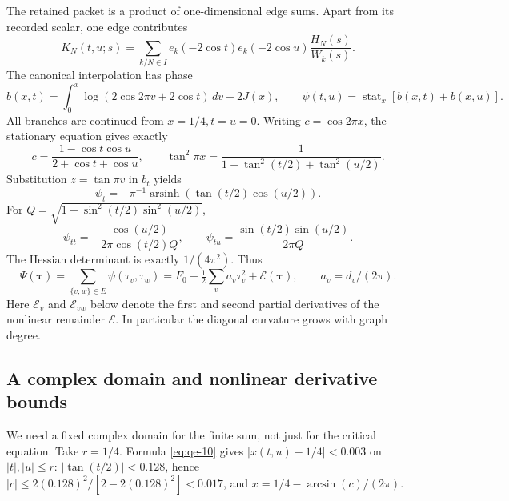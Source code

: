 The retained packet is a product of one-dimensional edge sums. Apart
from its recorded scalar, one edge contributes
\begin{equation}
K_N(t,u;s)=\sum_{k/N\in I}e_k(-2\cos t)e_k(-2\cos u)
                                      \frac{H_N(s)}{W_k(s)}.
\label{eq:qe-8}
\end{equation}
The canonical interpolation has phase
\begin{equation}
b(x,t)=\int_0^x\log(2\cos2\pi v+2\cos t)\,dv-2J(x),\qquad
 \psi(t,u)=\operatorname{stat}_x[b(x,t)+b(x,u)].
\label{eq:qe-9}
\end{equation}
All branches are continued from \(x=1/4,t=u=0\). Writing \(c=\cos2\pi x\), the stationary equation gives exactly
\begin{equation}
c=\frac{1-\cos t\cos u}{2+\cos t+\cos u},\qquad
 \tan^2\pi x=\frac1{1+\tan^2(t/2)+\tan^2(u/2)}.
\label{eq:qe-10}
\end{equation}
Substitution \(z=\tan\pi v\) in \(b_t\) yields
\begin{equation}
\psi_t=-\pi^{-1}\operatorname{arsinh}(\tan(t/2)\cos(u/2)).
\label{eq:qe-11}
\end{equation}
For \(Q=\sqrt{1-\sin^2(t/2)\sin^2(u/2)}\),
\begin{equation}
\psi_{tt}=-\frac{\cos(u/2)}{2\pi\cos(t/2)Q},\qquad
 \psi_{tu}=\frac{\sin(t/2)\sin(u/2)}{2\pi Q}.
\label{eq:qe-12}
\end{equation}
The Hessian determinant is exactly \(1/(4\pi^2)\). Thus
\begin{equation}
\Psi(\boldsymbol\tau)=\sum_{\{v,w\}\in E}\psi(\tau_v,\tau_w)
 =F_0-\tfrac12\sum_va_v\tau_v^2+\mathcal E(\boldsymbol\tau),
                 \qquad a_v=d_v/(2\pi).
\label{eq:qe-13}
\end{equation}
Here $\mathcal E_v$ and $\mathcal E_{vw}$ below denote the first
and second partial derivatives of the nonlinear remainder
$\mathcal E$. In particular the diagonal curvature grows with
graph degree.

\subsection{A complex domain and nonlinear derivative bounds}\label{sec:qe-5}

We need a fixed complex domain for the finite sum, not just for the
critical equation. Take \(r=1/4\). Formula \eqref{eq:qe-10} gives
\(|x(t,u)-1/4|<0.003\) on \(|t|,|u|\le r\):
\(|\tan(t/2)|<0.128\), hence
\(|c|\le2(0.128)^2/[2-2(0.128)^2]<0.017\), and
\(x=1/4-\arcsin(c)/(2\pi)\).

